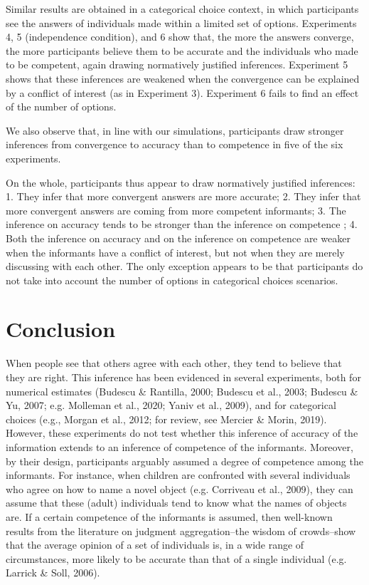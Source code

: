 \documentclass[
  doc,floatsintext]{apa6}
\begin{document}
Similar results are obtained in a categorical choice context, in which participants see the answers of individuals made within a limited set of options. Experiments 4, 5 (independence condition), and 6 show that, the more the answers converge, the more participants believe them to be accurate and the individuals who made to be competent, again drawing normatively justified inferences. Experiment 5 shows that these inferences are weakened when the convergence can be explained by a conflict of interest (as in Experiment 3). Experiment 6 fails to find an effect of the number of options.

We also observe that, in line with our simulations, participants draw stronger inferences from convergence to accuracy than to competence in five of the six experiments.

On the whole, participants thus appear to draw normatively justified inferences: 1. They infer that more convergent answers are more accurate; 2. They infer that more convergent answers are coming from more competent informants; 3. The inference on accuracy tends to be stronger than the inference on competence ; 4. Both the inference on accuracy and on the inference on competence are weaker when the informants have a conflict of interest, but not when they are merely discussing with each other. The only exception appears to be that participants do not take into account the number of options in categorical choices scenarios.

\section{Conclusion}\label{conclusion}

When people see that others agree with each other, they tend to believe that they are right. This inference has been evidenced in several experiments, both for numerical estimates (Budescu \& Rantilla, 2000; Budescu et al., 2003; Budescu \& Yu, 2007; e.g. Molleman et al., 2020; Yaniv et al., 2009), and for categorical choices (e.g., Morgan et al., 2012; for review, see Mercier \& Morin, 2019). However, these experiments do not test whether this inference of accuracy of the information extends to an inference of competence of the informants. Moreover, by their design, participants arguably assumed a degree of competence among the informants. For instance, when children are confronted with several individuals who agree on how to name a novel object (e.g. Corriveau et al., 2009), they can assume that these (adult) individuals tend to know what the names of objects are. If a certain competence of the informants is assumed, then well-known results from the literature on judgment aggregation--the wisdom of crowds--show that the average opinion of a set of individuals is, in a wide range of circumstances, more likely to be accurate than that of a single individual (e.g. Larrick \& Soll, 2006).
\end{document}
